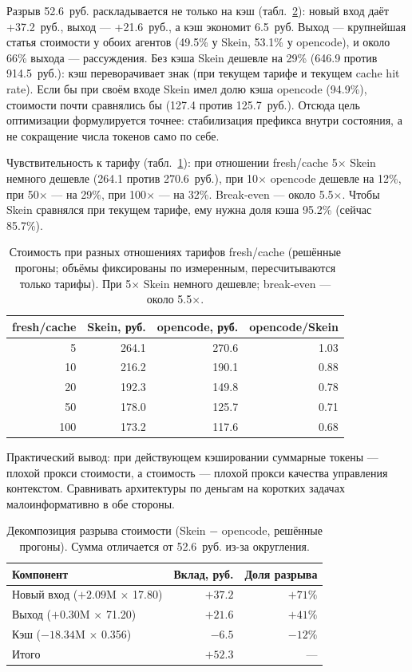 \documentclass[11pt,a4paper]{article}
\begin{document}
Разрыв 52.6~руб. раскладывается не только на кэш (табл.~\ref{tab:costsplit}): новый вход
даёт +37.2~руб., выход --- +21.6~руб., а кэш экономит 6.5~руб. Выход --- крупнейшая статья
стоимости у обоих агентов (49.5\% у Skein, 53.1\% у opencode), и около 66\% выхода ---
рассуждения. Без кэша Skein дешевле на 29\% (646.9 против 914.5~руб.): кэш переворачивает
знак (при текущем тарифе и текущем cache hit rate). Если бы при своём входе Skein имел долю
кэша opencode (94.9\%), стоимости почти сравнялись бы (127.4 против 125.7~руб.). Отсюда
цель оптимизации формулируется точнее: стабилизация префикса внутри состояния, а не
сокращение числа токенов само по себе.

Чувствительность к тарифу (табл.~\ref{tab:sensitivity}): при отношении fresh/cache 5$\times$
Skein немного дешевле (264.1 против 270.6~руб.), при 10$\times$ opencode дешевле на 12\%,
при 50$\times$ --- на 29\%, при 100$\times$ --- на 32\%. Break-even --- около 5.5$\times$.
Чтобы Skein сравнялся при текущем тарифе, ему нужна доля кэша 95.2\% (сейчас 85.7\%).

\begin{table}[t]
\centering
\small
\caption{Стоимость при разных отношениях тарифов fresh/cache (решённые прогоны; объёмы
фиксированы по измеренным, пересчитываются только тарифы). При 5$\times$ Skein немного
дешевле; break-even --- около 5.5$\times$.}
\label{tab:sensitivity}
\begin{tabular}{@{}rrrr@{}}
\toprule
fresh/cache & Skein, руб. & opencode, руб. & opencode/Skein \\
\midrule
5   & 264.1 & 270.6 & 1.03 \\
10  & 216.2 & 190.1 & 0.88 \\
20  & 192.3 & 149.8 & 0.78 \\
50  & 178.0 & 125.7 & 0.71 \\
100 & 173.2 & 117.6 & 0.68 \\
\bottomrule
\end{tabular}
\end{table}

Практический вывод: при действующем кэшировании суммарные токены --- плохой прокси
стоимости, а стоимость --- плохой прокси качества управления контекстом. Сравнивать
архитектуры по деньгам на коротких задачах малоинформативно в обе стороны.

\begin{table}[t]
\centering
\small
\caption{Декомпозиция разрыва стоимости (Skein $-$ opencode, решённые прогоны). Сумма
отличается от 52.6~руб. из-за округления.}
\label{tab:costsplit}
\begin{tabular}{@{}lrr@{}}
\toprule
Компонент & Вклад, руб. & Доля разрыва \\
\midrule
Новый вход ($+2.09$M $\times$ 17.80) & $+37.2$ & $+71\%$ \\
Выход ($+0.30$M $\times$ 71.20) & $+21.6$ & $+41\%$ \\
Кэш ($-18.34$M $\times$ 0.356) & $-6.5$ & $-12\%$ \\
\midrule
Итого & $+52.3$ & --- \\
\bottomrule
\end{tabular}
\end{table}
\end{document}
